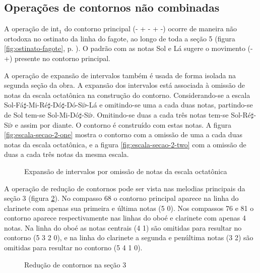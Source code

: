 \subsection{Operações de contornos não combinadas}
\label{sec:cont-nao-comb}

A operação de int$_1$ do contorno principal (- + - + -) ocorre de
maneira não ortodoxa no ostinato da linha do fagote, ao longo de toda
a seção 5 (figura \ref{fig:ostinato-fagote},
p. \pageref{fig:ostinato-fagote}). O padrão com as notas Sol e Lá
sugere o movimento (- +) presente no contorno principal.

A operação de expansão de intervalos também é usada de forma isolada
na segunda seção da obra. A expansão dos intervalos está associada à
omissão de notas da escala octatônica na construção do
contorno. Considerando-se a escala
Sol-Fá$\sharp$-Mi-Ré$\sharp$-Dó$\sharp$-Dó-Si$\flat$-Lá e omitindo-se
uma a cada duas notas, partindo-se de Sol tem-se
Sol-Mi-Dó$\sharp$-Si$\flat$. Omitindo-se duas a cada três notas tem-se
Sol-Ré$\sharp$-Si$\flat$ e assim por diante. O contorno é construído
com estas notas. A figura \ref{fig:escala-secao-2-one} mostra o
contorno com a omissão de uma a cada duas notas da escala octatônica,
e a figura \ref{fig:escala-secao-2-two} com a omissão de duas a cada
três notas da mesma escala.

\begin{figure}
  \centering

  \caption{Expansão de intervalos por omissão de notas da escala
    octatônica}
  \label{fig:escala-secao-2}
\end{figure}

A operação de redução de contornos pode ser vista nas melodias
principais da seção 3 (figura \ref{fig:reducao-contornos-secao-3}). No
compasso 68 o contorno principal \contpr{} aparece na linha do
clarinete com apenas sua primeira e última notas (5 0). Nos compassos
76 e 81 o contorno aparece respectivamente nas linhas do oboé e
clarinete com apenas 4 notas. Na linha do oboé as notas centrais (4 1)
são omitidas para resultar no contorno (5 3 2 0), e na linha do
clarinete a segunda e penúltima notas (3 2) são omitidas para resultar
no contorno (5 4 1 0).

\begin{figure}
  \centering



  \caption{Redução de contornos na seção 3}
  \label{fig:reducao-contornos-secao-3}
\end{figure}

